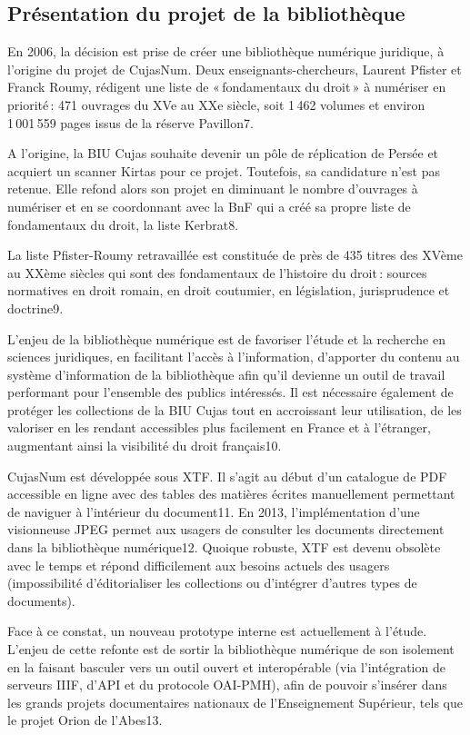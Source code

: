 \subsection*{Présentation du projet de la bibliothèque} 

En 2006, la décision est prise de créer une bibliothèque numérique juridique, à l’origine du projet de CujasNum. Deux enseignants-chercheurs, Laurent Pfister et Franck Roumy, rédigent une liste de « fondamentaux du droit » à numériser en priorité : 471 ouvrages du XVe au XXe siècle, soit 1 462 volumes et environ 1 001 559 pages issus de la réserve Pavillon7. 

A l’origine, la BIU Cujas souhaite devenir un pôle de réplication de Persée et acquiert un scanner Kirtas pour ce projet. Toutefois, sa candidature n’est pas retenue. Elle refond alors son projet en diminuant le nombre d’ouvrages à numériser et en se coordonnant avec la BnF qui a créé sa propre liste de fondamentaux du droit, la liste Kerbrat8.  

La liste Pfister-Roumy retravaillée est constituée de près de 435 titres des XVème au XXème siècles qui sont des fondamentaux de l’histoire du droit : sources normatives en droit romain, en droit coutumier, en législation, jurisprudence et doctrine9. 

L’enjeu de la bibliothèque numérique est de favoriser l’étude et la recherche en sciences juridiques, en facilitant l’accès à l’information, d’apporter du contenu au système d’information de la bibliothèque afin qu’il devienne un outil de travail performant pour l’ensemble des publics intéressés. Il est nécessaire également de protéger les collections de la BIU Cujas tout en accroissant leur utilisation, de les valoriser en les rendant accessibles plus facilement en France et à l’étranger, augmentant ainsi la visibilité du droit français10. 

CujasNum est développée sous XTF. Il s’agit au début d’un catalogue de PDF accessible en ligne avec des tables des matières écrites manuellement permettant de naviguer à l’intérieur du document11. En 2013, l’implémentation d’une visionneuse JPEG permet aux usagers de consulter les documents directement dans la bibliothèque numérique12. Quoique robuste, XTF est devenu obsolète avec le temps et répond difficilement aux besoins actuels des usagers (impossibilité d'éditorialiser les collections ou d'intégrer d’autres types de documents).  

Face à ce constat, un nouveau prototype interne est actuellement à l’étude. L’enjeu de cette refonte est de sortir la bibliothèque numérique de son isolement en la faisant basculer vers un outil ouvert et interopérable (via l’intégration de serveurs IIIF, d’API et du protocole OAI-PMH), afin de pouvoir s’insérer dans les grands projets documentaires nationaux de l’Enseignement Supérieur, tels que le projet Orion de l’Abes13. 

